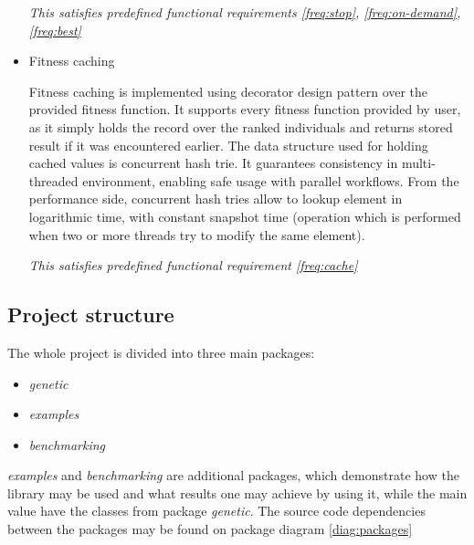 \begin{itemize}
\smallskip\textit{This satisfies predefined functional requirements \ref{freq:stop}, \ref{freq:on-demand}, \ref{freq:best}}

\medbreak

\item Fitness caching

Fitness caching is implemented using decorator design pattern over the provided fitness function. It supports every fitness function provided by user, as it simply holds the record over the ranked individuals and returns stored result if it was encountered earlier. The data structure used for holding cached values is concurrent hash trie. It guarantees consistency in multi-threaded environment, enabling safe usage with parallel workflows. From the performance side, concurrent hash tries allow to lookup element in logarithmic time, with constant snapshot time \cite{hash_tries} (operation which is performed when two or more threads try to modify the same element).

\smallskip\textit{This satisfies predefined functional requirement \ref{freq:cache}}
 
\medbreak


\end{itemize}

\subsection{Project structure}

The whole project is divided into three main packages:
\begin{itemize}
\item \textit{genetic}
\item \textit{examples}
\item \textit{benchmarking}
\end{itemize}

\textit{examples} and \textit{benchmarking} are additional packages, which demonstrate how the library may be used and what results one may achieve by using it, while the main value have the classes from package \textit{genetic}. The source code dependencies between the packages may be found on package diagram \ref{diag:packages}

